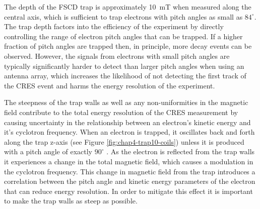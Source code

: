 \begin{table}[htbp]
\begin{minipage}{0.7\textwidth}
    \end{minipage}
    \label{fig:chap4-trap10-coils}
\end{table}

The depth of the FSCD trap is approximately 10~mT when measured along the central axis, which is sufficient to trap electrons with pitch angles as small as $84^\circ$. The trap depth factors into the efficiency of the experiment by directly controlling the range of electron pitch angles that can be trapped. If a higher fraction of pitch angles are trapped then, in principle, more decay events can be observed. However, the signals from electrons with small pitch angles are typically significantly harder to detect than larger pitch angles when using an antenna array, which increases the likelihood of not detecting the first track of the CRES event and harms the energy resolution of the experiment. 

The steepness of the trap walls as well as any non-uniformities in the magnetic field contribute to the total energy resolution of the CRES measurement by causing uncertainty in the relationship between an electron's kinetic energy and it's cyclotron frequency. When an electron is trapped, it oscillates back and forth along the trap z-axis (see Figure \ref{fig:chap4-trap10-coils}) unless it is produced with a pitch angle of exactly $90^\circ$ \cite{p8pheno}. As the electron is reflected from the trap walls it experiences a change in the total magnetic field, which causes a modulation in the cyclotron frequency. This change in magnetic field from the trap introduces a correlation between the pitch angle and kinetic energy parameters of the electron that can reduce energy resolution. In order to mitigate this effect it is important to make the trap walls as steep as possible. 




